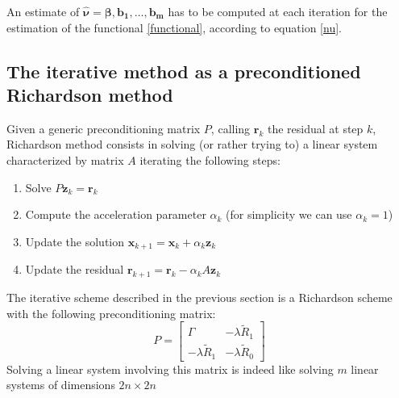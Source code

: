 An estimate of $\hat{\bm{\nu}} = \bm{\beta}, \bm{b_1}, \dots, \bm{b_m} $ has to be computed at each iteration for the estimation of the functional \ref{functional}, according to equation \ref{nu}.

\subsection{The iterative method as a preconditioned Richardson method}
Given a generic preconditioning matrix $P$, calling $\bm{r}_k$ the residual at step $k$,
Richardson method consists in solving (or rather trying to) a linear system characterized by matrix $A$ iterating the following steps:
\begin{enumerate}
    \item Solve $P \bm{z}_k = \bm{r}_k$
    \item Compute the acceleration parameter $\alpha_k$ (for simplicity we can use $\alpha_k = 1$)
    \item Update the solution $ \bm{x}_{k+1} = \bm{x}_{k} + \alpha_k \bm{z}_k $
    \item Update the residual $\bm{r}_{k+1} = \bm{r}_{k} - \alpha_k A \bm{z}_k$
\end{enumerate}

The iterative scheme described in the previous section is a Richardson scheme with the following preconditioning matrix:
\begin{equation}
    \label{precond}
    P=
    \begin{bmatrix}
        \Gamma & -\lambda \tilde{R}_1\\
        -\lambda \tilde{R}_1  & -\lambda \tilde{R}_0
    \end{bmatrix}
\end{equation}
Solving a linear system involving this matrix is indeed like solving $m$ linear systems of dimensions $2n\times 2n$  
